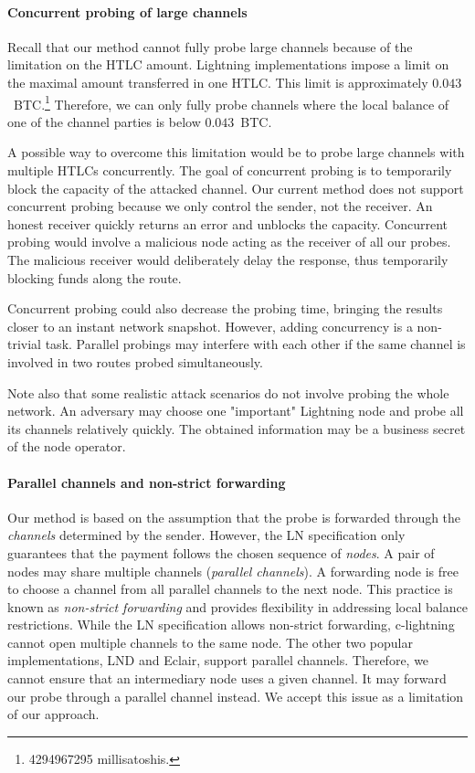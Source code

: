 \paragraph{Concurrent probing of large channels}

Recall that our method cannot fully probe large channels because of the limitation on the HTLC amount.
Lightning implementations impose a limit on the maximal amount transferred in one HTLC\@.
This limit is approximately $0.043$~BTC.\footnote{4294967295 millisatoshis.}
Therefore, we can only fully probe channels where the local balance of one of the channel parties is below $0.043$~BTC\@.

A possible way to overcome this limitation would be to probe large channels with multiple HTLCs concurrently.
The goal of concurrent probing is to temporarily block the capacity of the attacked channel.
Our current method does not support concurrent probing because we only control the sender, not the receiver.
An honest receiver quickly returns an error and unblocks the capacity.
Concurrent probing would involve a malicious node acting as the receiver of all our probes.
The malicious receiver would deliberately delay the response, thus temporarily blocking funds along the route.

Concurrent probing could also decrease the probing time, bringing the results closer to an instant network snapshot.
However, adding concurrency is a non-trivial task.
Parallel probings may interfere with each other if the same channel is involved in two routes probed simultaneously.

Note also that some realistic attack scenarios do not involve probing the whole network.
An adversary may choose one "important" Lightning node and probe all its channels relatively quickly.
The obtained information may be a business secret of the node operator.

\paragraph{Parallel channels and non-strict forwarding}

Our method is based on the assumption that the probe is forwarded through the \textit{channels} determined by the sender.
However, the LN specification only guarantees that the payment follows the chosen sequence of \textit{nodes}.
A pair of nodes may share multiple channels (\textit{parallel channels}).
A forwarding node is free to choose a channel from all parallel channels to the next node.
This practice is known as \textit{non-strict forwarding} and provides flexibility in addressing local balance restrictions.
While the LN specification allows non-strict forwarding, c-lightning cannot open multiple channels to the same node.
The other two popular implementations, LND and Eclair, support parallel channels.
Therefore, we cannot ensure that an intermediary node uses a given channel.
It may forward our probe through a parallel channel instead.
We accept this issue as a limitation of our approach.

